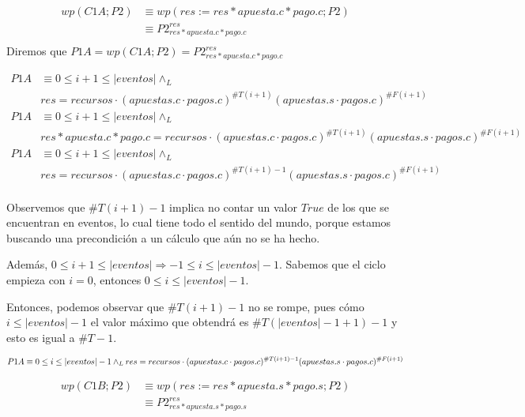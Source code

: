 \documentclass[../document.tex]{subfiles}
\begin{document}
\begin{equation} \label{eq2.a}
\begin{split}
wp(C1A;P2) & \equiv wp(res := res * apuesta.c * pago.c; P2) \\
           & \equiv P2^{res}_{res * apuesta.c * pago.c} \\
\end{split}
\end{equation}
Diremos que $P1A = wp(C1A;P2) = P2^{res}_{res * apuesta.c * pago.c}$

\begin{equation} \label{eq2.a}
\begin{split}
P1A & \equiv 0\leq i+1 \leq |eventos| \land_L \\& res = recursos \cdot (apuestas.c\cdot pagos.c)^{\#T(i+1)}(apuestas.s\cdot pagos.c)^{\#F(i+1)}\\
P1A & \equiv 0\leq i+1 \leq |eventos| \land_L \\& res * apuesta.c * pago.c = recursos \cdot (apuestas.c\cdot pagos.c)^{\#T(i+1)}(apuestas.s\cdot pagos.c)^{\#F(i+1)}\\
P1A & \equiv 0\leq i+1 \leq |eventos| \land_L \\& res = recursos \cdot (apuestas.c\cdot pagos.c)^{\#T(i+1)-1}(apuestas.s\cdot pagos.c)^{\#F(i+1)}\\
\end{split}
\end{equation}

Observemos que $\#T(i+1)-1$ implica no contar un valor $True$ de los que se encuentran en eventos, lo cual tiene todo el sentido del mundo, porque estamos buscando una precondición a un cálculo que aún no se ha hecho.

Además, $0\leq i+1 \leq |eventos| \Longrightarrow -1\leq i \leq |eventos|-1$. Sabemos que el ciclo empieza con $i=0$, entonces $0\leq i \leq |eventos|-1$.

Entonces, podemos observar que $\#T(i+1)-1$ no se rompe, pues cómo $i \leq |eventos|-1$ el valor máximo que obtendrá es $\#T(|eventos|-1+1)-1$ y esto es igual a $\#T-1$.

\begin{equation} \label{P1A}
    P1A \equiv 0\leq i \leq |eventos|-1 \land_L \\ res = recursos \cdot (apuestas.c\cdot pagos.c)^{\#T(i+1)-1}(apuestas.s\cdot pagos.c)^{\#F(i+1)}\\
\end{equation}

\begin{equation} \label{eq2.a}
\begin{split}
wp(C1B;P2) & \equiv wp(res := res * apuesta.s * pago.s; P2) \\
           & \equiv P2^{res}_{res * apuesta.s * pago.s} \\
\end{split}
\end{equation}
\end{document}
